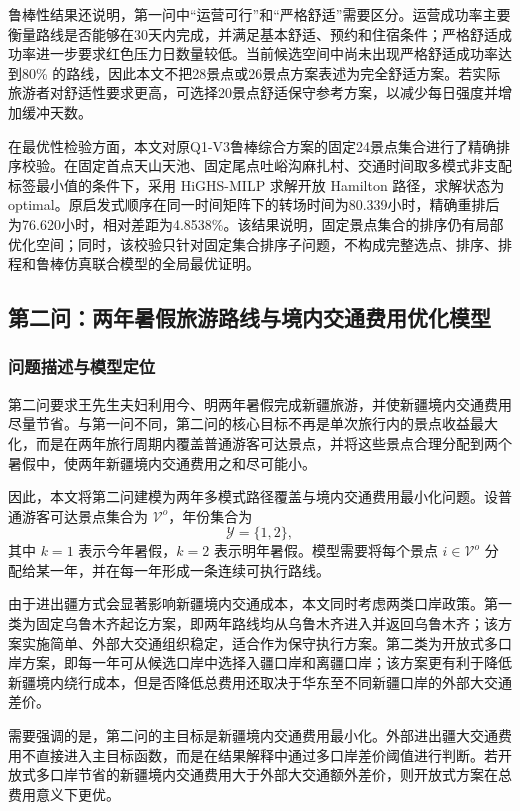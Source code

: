 \documentclass[UTF8,zihao=-4,a4paper]{ctexart}
\begin{document}
鲁棒性结果还说明，第一问中“运营可行”和“严格舒适”需要区分。运营成功率主要衡量路线是否能够在30天内完成，并满足基本舒适、预约和住宿条件；严格舒适成功率进一步要求红色压力日数量较低。当前候选空间中尚未出现严格舒适成功率达到80\% 的路线，因此本文不把28景点或26景点方案表述为完全舒适方案。若实际旅游者对舒适性要求更高，可选择20景点舒适保守参考方案，以减少每日强度并增加缓冲天数。

在最优性检验方面，本文对原Q1-V3鲁棒综合方案的固定24景点集合进行了精确排序校验。在固定首点天山天池、固定尾点吐峪沟麻扎村、交通时间取多模式非支配标签最小值的条件下，采用 HiGHS-MILP 求解开放 Hamilton 路径，求解状态为 optimal。原启发式顺序在同一时间矩阵下的转场时间为80.339小时，精确重排后为76.620小时，相对差距为4.8538\%。该结果说明，固定景点集合的排序仍有局部优化空间；同时，该校验只针对固定集合排序子问题，不构成完整选点、排序、排程和鲁棒仿真联合模型的全局最优证明。

\subsection{第二问：两年暑假旅游路线与境内交通费用优化模型}
\label{subsec:q2_model}

\subsubsection{问题描述与模型定位}
\label{subsubsec:q2_problem_position}

第二问要求王先生夫妇利用今、明两年暑假完成新疆旅游，并使新疆境内交通费用尽量节省。与第一问不同，第二问的核心目标不再是单次旅行内的景点收益最大化，而是在两年旅行周期内覆盖普通游客可达景点，并将这些景点合理分配到两个暑假中，使两年新疆境内交通费用之和尽可能小。

因此，本文将第二问建模为两年多模式路径覆盖与境内交通费用最小化问题。设普通游客可达景点集合为 $\mathcal{V}^{o}$，年份集合为
\[
\mathcal{Y}=\{1,2\},
\]
其中 $k=1$ 表示今年暑假，$k=2$ 表示明年暑假。模型需要将每个景点 $i\in\mathcal{V}^{o}$ 分配给某一年，并在每一年形成一条连续可执行路线。

由于进出疆方式会显著影响新疆境内交通成本，本文同时考虑两类口岸政策。第一类为固定乌鲁木齐起讫方案，即两年路线均从乌鲁木齐进入并返回乌鲁木齐；该方案实施简单、外部大交通组织稳定，适合作为保守执行方案。第二类为开放式多口岸方案，即每一年可从候选口岸中选择入疆口岸和离疆口岸；该方案更有利于降低新疆境内绕行成本，但是否降低总费用还取决于华东至不同新疆口岸的外部大交通差价。

需要强调的是，第二问的主目标是新疆境内交通费用最小化。外部进出疆大交通费用不直接进入主目标函数，而是在结果解释中通过多口岸差价阈值进行判断。若开放式多口岸节省的新疆境内交通费用大于外部大交通额外差价，则开放式方案在总费用意义下更优。
\end{document}
